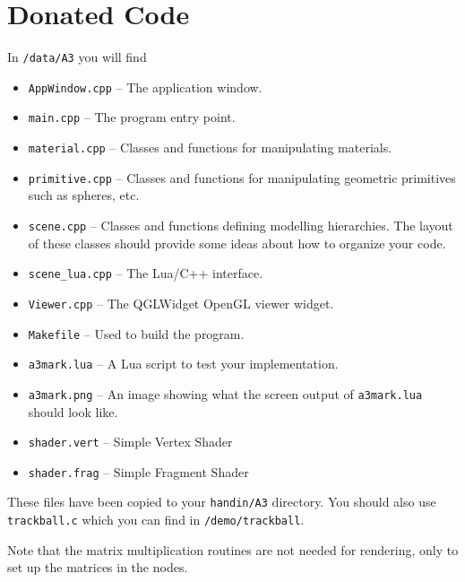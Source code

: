\section{Donated Code}
In \texttt{\CourseData/data/A3} you will find
\begin{itemize}
\item {\tt AppWindow.cpp} -- The application window.
\item {\tt main.cpp} -- The program entry point.
\item {\tt material.cpp} -- Classes and functions for manipulating
  materials.
\item {\tt primitive.cpp} -- Classes and functions for manipulating
  geometric primitives such as spheres, etc.
\item {\tt scene.cpp} -- Classes and functions defining modelling
  hierarchies.  The layout of these classes should provide
  some ideas about how to organize your code.
\item {\tt scene\_lua.cpp} -- The Lua/C++ interface.
\item {\tt Viewer.cpp} -- The QGLWidget OpenGL viewer widget.
\item {\tt Makefile} -- Used to build the program.
\item {\tt a3mark.lua} -- A Lua script to test your implementation.
\item {\tt a3mark.png} -- An image showing what the screen output
  of {\tt a3mark.lua} should look like.
\item {\tt shader.vert} -- Simple Vertex Shader
\item {\tt shader.frag} -- Simple Fragment Shader
\end{itemize}
These files have been copied to your \texttt{handin/A3} directory.
You should also use {\tt trackball.c} which you can find
in {\tt \CourseData/demo/trackball}.

Note that the matrix multiplication routines are not needed for rendering,
only to set up the matrices in the nodes.

